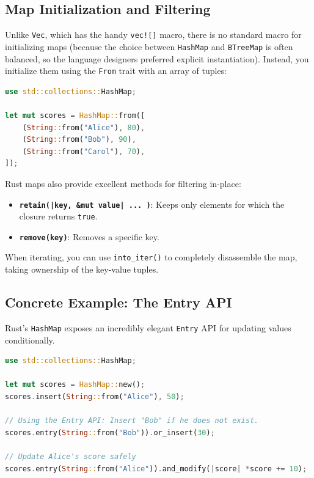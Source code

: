 \subsection{Map Initialization and Filtering}
Unlike \texttt{Vec}, which has the handy \texttt{vec![]} macro, there is no standard macro for initializing maps (because the choice between \texttt{HashMap} and \texttt{BTreeMap} is often balanced, so the language designers preferred explicit instantiation). Instead, you initialize them using the \texttt{From} trait with an array of tuples:

\begin{lstlisting}[language=Rust]
use std::collections::HashMap;

let mut scores = HashMap::from([
    (String::from("Alice"), 80),
    (String::from("Bob"), 90),
    (String::from("Carol"), 70),
]);
\end{lstlisting}

Rust maps also provide excellent methods for filtering in-place:
\begin{itemize}
    \item \textbf{\texttt{retain(|key, \&mut value| ... )}}: Keeps only elements for which the closure returns \texttt{true}.
    \item \textbf{\texttt{remove(key)}}: Removes a specific key. 
\end{itemize}

When iterating, you can use \texttt{into\_iter()} to completely disassemble the map, taking ownership of the key-value tuples.

\subsection{Concrete Example: The Entry API}
Rust's \texttt{HashMap} exposes an incredibly elegant \texttt{Entry} API for updating values conditionally.

\begin{lstlisting}[language=Rust]
use std::collections::HashMap;

let mut scores = HashMap::new();
scores.insert(String::from("Alice"), 50);

// Using the Entry API: Insert "Bob" if he does not exist.
scores.entry(String::from("Bob")).or_insert(30);

// Update Alice's score safely
scores.entry(String::from("Alice")).and_modify(|score| *score += 10);
\end{lstlisting}


